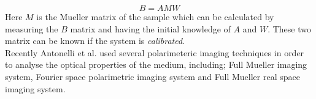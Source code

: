 \documentclass[oneside,a4,12p]{report} %
\begin{document}
	\begin{equation}
	\label{eq:LCMuellerEq}
	B = AMW
	\end{equation}
Here $M$ is the Mueller matrix of the sample which can be calculated by measuring the $B$ matrix and having the initial knowledge of $A$ and $W$. These two matrix can be known if the system is \textit{calibrated}\cite{compain1999general}.\\


Recently Antonelli et al.\cite{antonelli2011biomedical} used several polarimeteric imaging techniques in order to analyse the optical properties of the medium, including; Full Mueller imaging system, Fourier space polarimetric imaging system  and Full Mueller real space imaging system. 
\end{document}
